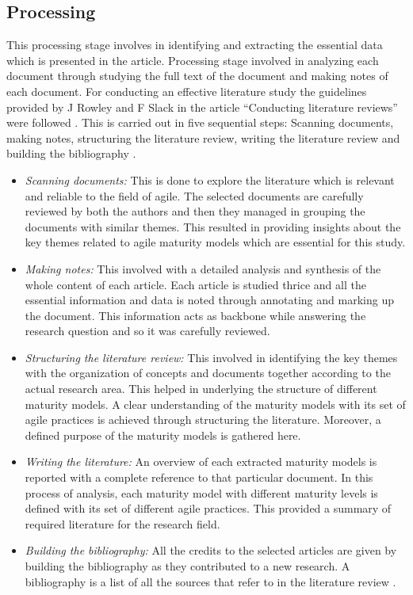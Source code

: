 \documentclass[a4paper,oneside]{bth}
\begin{document}
\subsection{Processing}
This processing stage involves in identifying and extracting the essential data which is presented in the article. Processing stage involved in analyzing each document through studying the full text of the document and making notes of each document. For conducting an effective literature study the guidelines provided by J Rowley and F Slack in the article “Conducting literature reviews” were followed \cite{rowley_conducting_2004}. This is carried out in five sequential steps: Scanning documents, making notes, structuring the literature review, writing the literature review and building the bibliography \cite{rowley_conducting_2004}.
\begin{itemize}
\item \textit{Scanning documents:} This is done to explore the literature which is relevant and reliable to the field of agile. The selected documents are carefully reviewed by both the authors and then they managed in grouping the documents with similar themes. This resulted in providing insights about the key themes related to agile maturity models which are essential for this study.
\item \textit{Making notes:} This involved with a detailed analysis and synthesis of the whole content of each article. Each article is studied thrice and all the essential information and data is noted through annotating and marking up the document. This information acts as backbone while answering the research question and so it was carefully reviewed.
\item \textit{Structuring the literature review:} This involved in identifying the key themes with the organization of concepts and documents together according to the actual research area. This helped in underlying the structure of different maturity models. A clear understanding of the maturity models with its set of agile practices is achieved through structuring the literature. Moreover, a defined purpose of the maturity models is gathered here.
\item \textit{Writing the literature:} An overview of each extracted maturity models is reported with a complete reference to that particular document. In this process of analysis, each maturity model with different maturity levels is defined with its set of different agile practices. This provided a summary of required literature for the research field.
\item \textit{Building the bibliography:} All the credits to the selected articles are given by building the bibliography as they contributed to a new research. A bibliography is a list of all the sources that refer to in the literature review \cite{rowley_conducting_2004}. 
\end{itemize}
\end{document}
